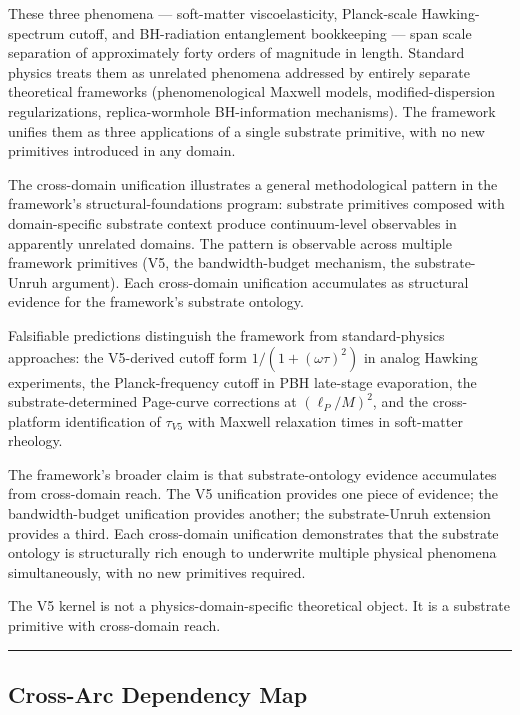 \documentclass[
  11pt,
  a4paperpaper,
]{article}
\begin{document}
These three phenomena --- soft-matter viscoelasticity, Planck-scale
Hawking-spectrum cutoff, and BH-radiation entanglement bookkeeping ---
span scale separation of approximately forty orders of magnitude in
length. Standard physics treats them as unrelated phenomena addressed by
entirely separate theoretical frameworks (phenomenological Maxwell
models, modified-dispersion regularizations, replica-wormhole
BH-information mechanisms). The framework unifies them as three
applications of a single substrate primitive, with no new primitives
introduced in any domain.

The cross-domain unification illustrates a general methodological
pattern in the framework's structural-foundations program: substrate
primitives composed with domain-specific substrate context produce
continuum-level observables in apparently unrelated domains. The pattern
is observable across multiple framework primitives (V5, the
bandwidth-budget mechanism, the substrate-Unruh argument). Each
cross-domain unification accumulates as structural evidence for the
framework's substrate ontology.

Falsifiable predictions distinguish the framework from standard-physics
approaches: the V5-derived cutoff form \(1/(1+(\omega\tau)^2)\) in
analog Hawking experiments, the Planck-frequency cutoff in PBH
late-stage evaporation, the substrate-determined Page-curve corrections
at \((\ell_P/M)^2\), and the cross-platform identification of
\(\tau_{V5}\) with Maxwell relaxation times in soft-matter rheology.

The framework's broader claim is that substrate-ontology evidence
accumulates from cross-domain reach. The V5 unification provides one
piece of evidence; the bandwidth-budget unification provides another;
the substrate-Unruh extension provides a third. Each cross-domain
unification demonstrates that the substrate ontology is structurally
rich enough to underwrite multiple physical phenomena simultaneously,
with no new primitives required.

The V5 kernel is not a physics-domain-specific theoretical object. It is
a substrate primitive with cross-domain reach.

\begin{center}\rule{0.5\linewidth}{0.5pt}\end{center}

\subsection{Cross-Arc Dependency Map}\label{cross-arc-dependency-map}
\end{document}
